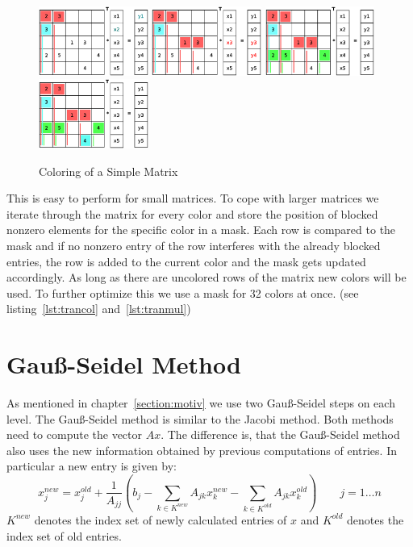\documentclass[a4paper,11pt]{scrartcl}
\begin{document}
\begin{figure}[ht]
\includegraphics[width=0.32\textwidth]{graphic/coloringT7.eps}
\includegraphics[width=0.32\textwidth]{graphic/coloringT8.eps}\hfill\vline\hfill
\includegraphics[width=0.32\textwidth]{graphic/coloringT9.eps}\hfill\vline\hfill
\includegraphics[width=0.32\textwidth]{graphic/coloringT10.eps}
\caption{Coloring of a Simple Matrix}\label{figure:coloring}
\end{figure}

This is easy to perform for small matrices. To cope with larger matrices we
iterate through the matrix for every color and store the position of blocked
nonzero elements for the specific color in a mask.
Each row is compared to the mask and if no nonzero entry of the row interferes
with the already blocked entries, the row is added to the current color and the
mask gets updated accordingly.
As long as there are uncolored rows of the matrix new colors will be used.
To further optimize this we use a mask for 32 colors at once.
(see listing~\ref{lst:trancol}
and~\ref{lst:tranmul})



\section{Gauß-Seidel Method} \label{section:gs}
As mentioned in chapter~\ref{section:motiv} we use two Gauß-Seidel steps on
each level. The Gauß-Seidel method is similar to the Jacobi method.
Both methods need to compute the vector $Ax$. The difference is, that the
Gauß-Seidel method also uses the new information obtained by previous
computations of entries.
In particular a new entry is given by:
$$ x_j^{new} = x_j^{old} + \frac{1}{A_{jj}} \left(b_{j} -
  \sum_{k \in K^{new}}A_{jk} x_k^{new} - \sum_{k \in K^{old}}A_{jk} x_k^{old}
  \right) \qquad j = 1 \dots n$$
$K^{new}$ denotes the index set of newly calculated entries
of $x$ and $K^{old}$ denotes the index set of old entries.
\cite{iterative}
\end{document}
